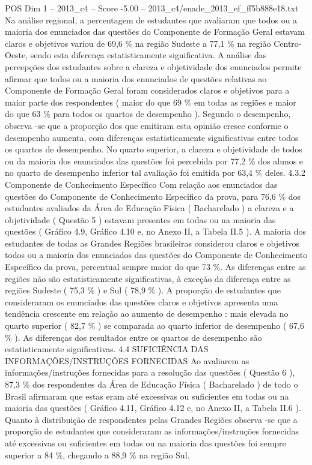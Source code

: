 \begin{textsample}{POS Dim 1 – 2013\_c4 – Score -5.00 – 2013\_c4/enade\_2013\_ef\_ff5b888e18.txt}
Na análise regional, a percentagem de estudantes que avaliaram que todos ou a maioria dos enunciados das questões do Componente de Formação Geral estavam claros e objetivos variou de 69,6 \% na região Sudeste a 77,1 \% na região Centro-Oeste, sendo esta diferença estatisticamente significativa.
A análise das percepções dos estudantes sobre a clareza e objetividade dos enunciados permite afirmar que todos ou a maioria dos enunciados de questões relativas ao Componente de Formação Geral foram considerados claros e objetivos para a maior parte dos respondentes ( maior do que 69 \% em todas as regiões e maior do que 63 \% para todos os quartos de desempenho ).
Segundo o desempenho, observa -se que a proporção dos que emitiram esta opinião cresce conforme o desempenho aumenta, com diferenças estatisticamente significativas entre todos os quartos de desempenho.
No quarto superior, a clareza e objetividade de todos ou da maioria dos enunciados das questões foi percebida por 77,2 \% dos alunos e no quarto de desempenho inferior tal avaliação foi emitida por 63,4 \% deles. 4.3.2 Componente de Conhecimento Específico Com relação aos enunciados das questões do Componente de Conhecimento Específico da prova, para 76,6 \% dos estudantes avaliados da Área de Educação Física ( Bacharelado ) a clareza e a objetividade ( Questão 5 ) estavam presentes em todas ou na maioria das questões ( Gráfico 4.9, Gráfico 4.10 e, no Anexo II, a Tabela II.5 ).
A maioria dos estudantes de todas as Grandes Regiões brasileiras considerou claros e objetivos todos ou a maioria dos enunciados das questões do Componente de Conhecimento Específico da prova, percentual sempre maior do que 73 \%.
As diferenças entre as regiões não são estatisticamente significativas, à exceção da diferença entre as regiões Sudeste ( 75,3 \% ) e Sul ( 78,9 \% ).
A proporção de estudantes que consideraram os enunciados das questões claros e objetivos apresenta uma tendência crescente em relação ao aumento de desempenho : mais elevada no quarto superior ( 82,7 \% ) se comparada ao quarto inferior de desempenho ( 67,6 \% ).
As diferenças dos resultados entre os quartos de desempenho são estatisticamente significativas. 4.4 SUFICIÊNCIA DAS INFORMAÇÕES/INSTRUÇÕES FORNECIDAS Ao avaliarem as informações/instruções fornecidas para a resolução das questões ( Questão 6 ), 87,3 \% dos respondentes da Área de Educação Física ( Bacharelado ) de todo o Brasil afirmaram que estas eram até excessivas ou suficientes em todas ou na maioria das questões ( Gráfico 4.11, Gráfico 4.12 e, no Anexo II, a Tabela II.6 ).
Quanto à distribuição de respondentes pelas Grandes Regiões observa -se que a proporção de estudantes que consideraram as informações/instruções fornecidas até excessivas ou suficientes em todas ou na maioria das questões foi sempre superior a 84 \%, chegando a 88,9 \% na região Sul.

\end{textsample}
